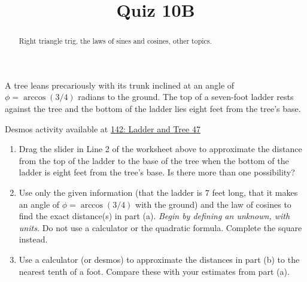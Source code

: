 \documentclass{ximera}
\title{Quiz 10B}
\begin{document}
\begin{abstract}
Right triangle trig, the laws of sines and cosines, other topics.
\end{abstract}
\maketitle


\begin{question} \label{QLMVVEVEeddf}
A tree leans precariously with its trunk inclined at an angle of $\phi=\arccos(3/4)$ radians to the ground. The top of a seven-foot ladder rests against the tree and the bottom of the ladder lies eight feet from the tree's base. %

\begin{onlineOnly}
    \begin{center}
\end{center}
\end{onlineOnly}

Desmos activity available at \href{https://www.desmos.com/calculator/ysxikgbmt6}{142: Ladder and Tree 47}

\begin{enumerate}
\item Drag the slider in Line 2 of the worksheet above to approximate the distance from the top of the ladder to the base of the tree when the bottom of the ladder is eight feet from the tree's base. Is there more than one possibility?

\item Use only the given information (that the ladder is $7$ feet long, that it makes an angle of $\phi=\arccos(3/4)$ with the ground) and the law of cosines to find the exact distance(s) in part (a). \emph{Begin by defining an unknown, with units.} 
Do not use a calculator or the quadratic formula. Complete the square instead.

\item Use a calculator (or desmos) to approximate the distances in part (b) to the nearest tenth of a foot. Compare these with your estimates from part (a).
\end{enumerate}
\end{question}
\end{document}
